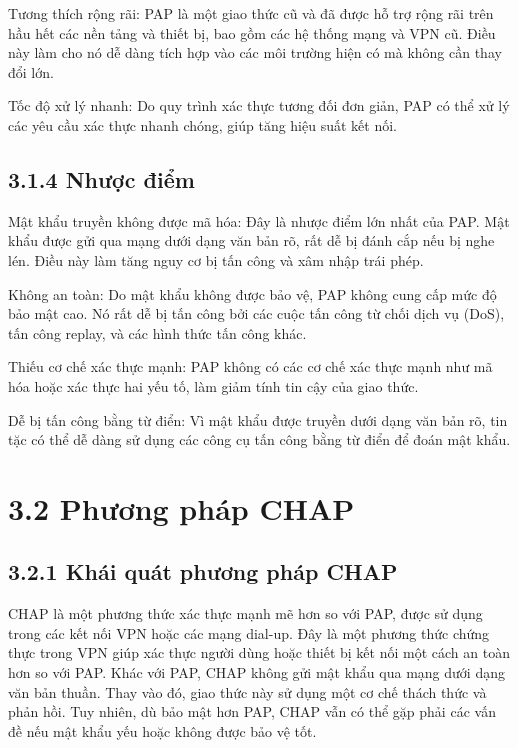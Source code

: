 Tương thích rộng rãi: PAP là một giao thức cũ và đã được hỗ trợ rộng rãi trên hầu hết các nền tảng và thiết bị, bao gồm các hệ thống mạng và VPN cũ. Điều này làm cho nó dễ dàng tích hợp vào các môi trường hiện có mà không cần thay đổi lớn.
 
Tốc độ xử lý nhanh: Do quy trình xác thực tương đối đơn giản, PAP có thể xử lý các yêu cầu xác thực nhanh chóng, giúp tăng hiệu suất kết nối.

 \subsection*{3.1.4 Nhược điểm}

Mật khẩu truyền không được mã hóa: Đây là nhược điểm lớn nhất của PAP. Mật khẩu được gửi qua mạng dưới dạng văn bản rõ, rất dễ bị đánh cắp nếu bị nghe lén. Điều này làm tăng nguy cơ bị tấn công và xâm nhập trái phép.

Không an toàn: Do mật khẩu không được bảo vệ, PAP không cung cấp mức độ bảo mật cao. Nó rất dễ bị tấn công bởi các cuộc tấn công từ chối dịch vụ (DoS), tấn công replay, và các hình thức tấn công khác.

Thiếu cơ chế xác thực mạnh: PAP không có các cơ chế xác thực mạnh như mã hóa hoặc xác thực hai yếu tố, làm giảm tính tin cậy của giao thức.

Dễ bị tấn công bằng từ điển: Vì mật khẩu được truyền dưới dạng văn bản rõ, tin tặc có thể dễ dàng sử dụng các công cụ tấn công bằng từ điển để đoán mật khẩu.

 
 \section*{3.2 Phương pháp CHAP}
 \subsection*{3.2.1 Khái quát phương pháp CHAP}
CHAP là một phương thức xác thực mạnh mẽ hơn so với PAP, được sử dụng trong các kết nối VPN hoặc các mạng dial-up. Đây là một phương thức chứng thực trong VPN giúp xác thực người dùng hoặc thiết bị kết nối một cách an toàn hơn so với PAP. Khác với PAP, CHAP không gửi mật khẩu qua mạng dưới dạng văn bản thuần. Thay vào đó, giao thức này sử dụng một cơ chế thách thức và phản hồi. Tuy nhiên, dù bảo mật hơn PAP, CHAP vẫn có thể gặp phải các vấn đề nếu mật khẩu yếu hoặc không được bảo vệ tốt.

